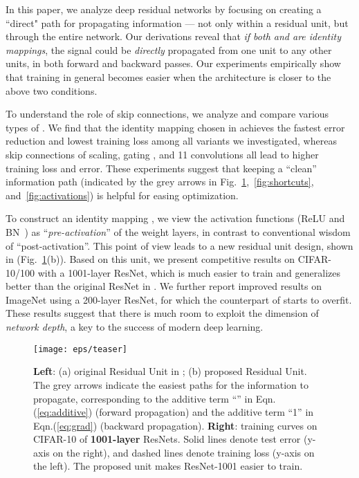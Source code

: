 \documentclass[runningheads]{llncs}
\begin{document}
In this paper, we analyze deep residual networks by focusing on creating a ``direct" path for propagating information --- not only within a residual unit, but through the entire network. Our derivations reveal that \emph{if both  and  are identity mappings}, the signal could be \emph{directly} propagated from one unit to any other units, in both forward and backward passes. Our experiments empirically show that training in general becomes easier when the architecture is closer to the above two conditions.

To understand the role of skip connections, we analyze and compare various types of . We find that the identity mapping  chosen in \cite{He2016} achieves the fastest error reduction and lowest training loss among all variants we investigated, whereas skip connections of scaling, gating \cite{Hochreiter1997,Srivastava2015,Srivastava2015a}, and 11 convolutions all lead to higher training loss and error. These experiments suggest that keeping a ``clean'' information path (indicated by the grey arrows in Fig.~\ref{fig:teaser},~\ref{fig:shortcuts}, and~\ref{fig:activations}) is helpful for easing optimization.

To construct an identity mapping , we view the activation functions (ReLU and BN~\cite{Ioffe2015}) as ``\emph{pre-activation}'' of the weight layers, in contrast to conventional wisdom of ``post-activation''. This point of view leads to a new residual unit design, shown in (Fig.~\ref{fig:teaser}(b)). Based on this unit, we present competitive results on CIFAR-10/100 with a 1001-layer ResNet, which is much easier to train and generalizes better than the original ResNet in \cite{He2016}. We further report improved results on ImageNet using a 200-layer ResNet, for which the counterpart of \cite{He2016} starts to overfit. These results suggest that there is much room to exploit the dimension of \emph{network depth}, a key to the success of modern deep learning.


\begin{figure}[t]
\centering
\texttt{[image: eps/teaser]}
\caption{\textbf{Left}: (a) original Residual Unit in \cite{He2016}; (b) proposed Residual Unit. The grey arrows indicate the easiest paths for the information to propagate, corresponding to the additive term ``'' in Eqn.(\ref{eq:additive}) (forward propagation) and the additive term ``1'' in Eqn.(\ref{eq:grad}) (backward propagation). \textbf{Right}: training curves on CIFAR-10 of \textbf{1001-layer} ResNets. Solid lines denote test error (y-axis on the right), and dashed lines denote training loss (y-axis on the left). The proposed unit makes ResNet-1001 easier to train.}
\label{fig:teaser}
\end{figure}
\end{document}
